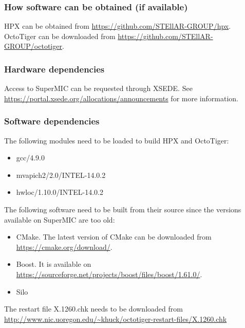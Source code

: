 \subsubsection{How software can be obtained (if available)}
HPX can be obtained from \url{https://github.com/STEllAR-GROUP/hpx}. OctoTiger can be downloaded from \url{https://github.com/STEllAR-GROUP/octotiger}.


\subsubsection{Hardware dependencies}
Access to SuperMIC can be requested through XSEDE. See \url{https://portal.xsede.org/allocations/announcements} for more information.

\subsubsection{Software dependencies}
\label{software-dependencies}
The following modules need to be loaded to build HPX and OctoTiger:
\begin{itemize}
\item{gcc/4.9.0}
\item{mvapich2/2.0/INTEL-14.0.2}
\item{hwloc/1.10.0/INTEL-14.0.2}
\end{itemize}

The following software need to be built from their source since the versions available on SuperMIC are too old:
\begin{itemize}
\item{CMake. The latest version of CMake can be downloaded from \url{https://cmake.org/download/}.}
\item{Boost. It is available on \url{https://sourceforge.net/projects/boost/files/boost/1.61.0/}.}
\item{Silo}
\end{itemize}

The restart file X.1260.chk needs to be downloaded from \url{http://www.nic.uoregon.edu/~khuck/octotiger-restart-files/X.1260.chk}

